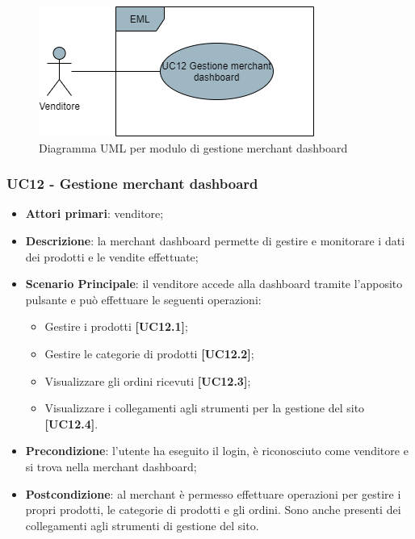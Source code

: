 \begin{figure}[H]
\centering
\includegraphics[scale=0.6]{res/UseCase/Immagini/MerchantDashboardGenerale}
\caption{Diagramma UML per modulo di gestione merchant dashboard}
\end{figure}

\subsubsection{UC12 - Gestione merchant dashboard}
\begin{itemize}
\item \textbf{Attori primari}: venditore;
\item \textbf{Descrizione}: la merchant dashboard permette di gestire e monitorare i dati dei prodotti e le vendite effettuate;
\item \textbf{Scenario Principale}: il venditore accede alla dashboard tramite l'apposito pulsante e può effettuare le seguenti operazioni:
\begin{itemize}
	\item Gestire i prodotti \textbf{[UC12.1]};
	\item Gestire le categorie di prodotti \textbf{[UC12.2]};
	\item Visualizzare gli ordini ricevuti \textbf{[UC12.3]};
	\item Visualizzare i collegamenti agli strumenti per la gestione del sito \textbf{[UC12.4]}.
\end{itemize}
\item \textbf{Precondizione}: l'utente ha eseguito il login, è riconosciuto come venditore e si trova nella merchant dashboard;
\item \textbf{Postcondizione}: al merchant è permesso effettuare operazioni per gestire i propri prodotti, le categorie di prodotti e gli ordini. Sono anche presenti dei collegamenti agli strumenti di gestione del sito.
\end{itemize}

